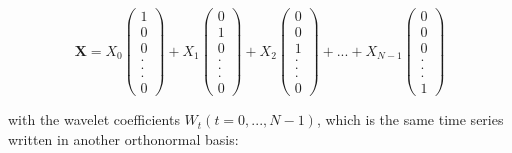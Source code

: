 \documentclass[main.tex]{subfiles}
\begin{document}
\begin{equation}
\bm{X} = X_0 \begin{pmatrix} 1 \\ 0 \\ 0 \\ . \\ . \\ . \\ 0 \end{pmatrix}
+ X_1 \begin{pmatrix} 0 \\ 1 \\ 0 \\ . \\ . \\ . \\ 0 \end{pmatrix}
+ X_2 \begin{pmatrix} 0 \\ 0 \\ 1 \\ . \\ . \\ . \\ 0 \end{pmatrix}
+ ... + X_{N - 1} \begin{pmatrix} 0 \\ 0 \\ 0 \\ . \\ . \\ . \\ 1 \end{pmatrix}
\end{equation}

with the wavelet coefficients $W_t (t = 0 , ... , N - 1)$, which is the same time series written in another orthonormal basis:
\end{document}
